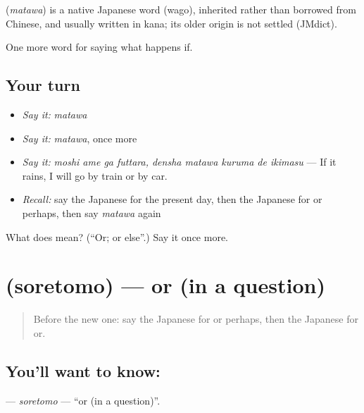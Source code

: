\begin{cousinweb}
\textbf{} (\emph{matawa}) is a native Japanese word (wago), inherited rather than borrowed from Chinese, and usually written in kana; its older origin is not settled (JMdict).
\end{cousinweb}

\begin{grammarlens}[title={What you've built}]
One more word for saying what happens if.
\end{grammarlens}

\subsection*{Your turn}
\begin{itemize}
\raggedright
  \item \emph{Say it:} \emph{matawa}
  \item \emph{Say it:} \emph{matawa}, once more
  \item \emph{Say it:} \emph{moshi ame ga futtara, densha matawa kuruma de ikimasu} — If it rains, I will go by train or by car.
  \item \emph{Recall:} say the Japanese for the present day, then the Japanese for or perhaps, then say \emph{matawa} again
\end{itemize}

\begin{tcolorbox}[breakable,colback=teal!4,colframe=teal!35!black,title={Before you move on}]
What does  mean? (\textquotedblleft{}Or; or else\textquotedblright{}.) Say it once more.
\end{tcolorbox}
\section[\texorpdfstring{\ja{それとも} (soretomo)}{それとも (soretomo)}]{ (soretomo) — or (in a question)}

\label{lesson:JA-C528-soretomo}



\begin{quote}
Before the new one: say the Japanese for or perhaps, then the Japanese for or.
\end{quote}

\subsection*{You'll want to know: }
\textbf{} — \emph{soretomo} — \textquotedblleft{}or (in a question)\textquotedblright{}.

